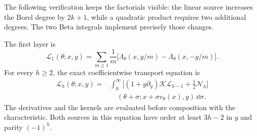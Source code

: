 The following verification keeps the factorials visible: the linear
source increases the Borel degree by $2k+1$, while a quadratic
product requires two additional degrees. The two Beta integrals
implement precisely those changes.

\begin{prp}\label{prp:s07:borel-transport}
The first layer is
\begin{equation}\label{eq:s07:borel-one}
 \mathcal L_1(\theta;x,y)
 =\sum_{m\geq1}\frac1m
       \bigl[\Lambda_\theta(x,y/m)-\Lambda_\theta(x,-y/m)\bigr].
\end{equation}
For every $h\geq2$, the exact coefficientwise transport equation is
\begin{equation}\label{eq:s07:borel-transport}
 \begin{aligned}
 \mathcal L_h(\theta;x,y)
 ={}&\int_0^\infty\bigl[(1+y\partial_y)
                               \mathcal K\mathcal L_{h-1}
                      +\tfrac12\mathcal N_h\bigr]\\
 &\quad(\theta+\sigma;
                  x+\sigma v_\theta(x),y)\,\dd\sigma.
 \end{aligned}
\end{equation}
The derivatives and the kernels are evaluated before composition
with the characteristic. Both sources in this equation have order
at least $3h-2$ in $y$ and parity $(-1)^h$.
\end{prp}
